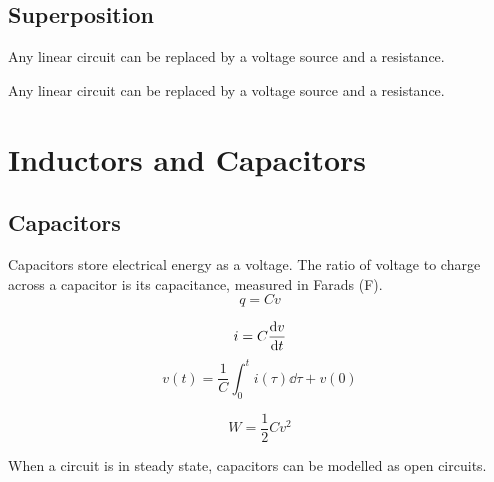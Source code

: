 \documentclass{article}
\begin{document}
\subsection{Superposition}
\begin{theorem}
    Any linear circuit can be replaced by a voltage source and a resistance.
\end{theorem}
\begin{theorem}
    Any linear circuit can be replaced by a voltage source and a resistance.
\end{theorem}
\newpage
\section{Inductors and Capacitors}
\subsection{Capacitors}
\begin{definition}
    Capacitors store electrical energy as a voltage. The ratio of voltage 
    to charge across a capacitor is its capacitance, measured in Farads (\si{\farad}).
    \begin{equation*}
        q = C v
    \end{equation*}
\end{definition}
\begin{definition}[VI Relationship]
    \begin{equation*}
        i = C \dv{v}{t}
    \end{equation*}
    \begin{equation*}
        v(t) = \frac{1}{C} \int_0^t i(\tau) \dd{\tau} + v(0)
    \end{equation*}
\end{definition}
\begin{definition}
    \begin{equation*}
        W = \frac{1}{2}Cv^2
    \end{equation*}
\end{definition}
\begin{theorem}
    When a circuit is in steady state, capacitors can be modelled as open circuits.
\end{theorem}
\end{document}
